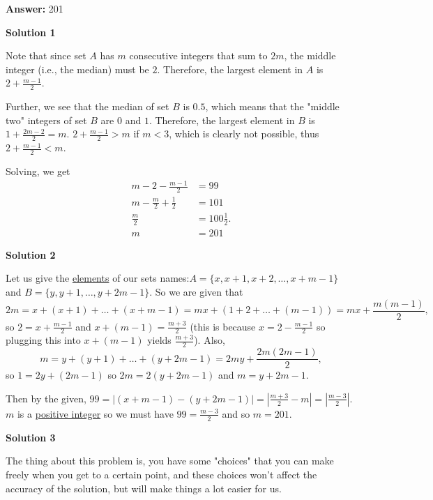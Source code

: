 \begin{enumerate}
 \textbf{Answer: }201



\textbf{Solution 1}

Note that since set $A$ has $m$ consecutive integers that sum to $2m$, the middle integer (i.e., the median) must be $2$.  Therefore, the largest element in $A$ is $2 + \frac{m-1}{2}$. 

 Further, we see that the median of set $B$ is $0.5$, which means that the "middle two" integers of set $B$ are $0$ and $1$.  Therefore, the largest element in $B$ is $1 + \frac{2m-2}{2} = m$.  $2 + \frac{m-1}{2} > m$ if $m < 3$, which is clearly not possible, thus $2 + \frac{m-1}{2} < m$.

 Solving, we get 
 \begin{align*} m - 2 - \frac{m-1}{2} &= 99\\ m-\frac{m}{2}+\frac{1}{2}&=101\\ \frac{m}{2}&=100\frac{1}{2}.\\ m &= \boxed{201}\end{align*}





\textbf{Solution 2}

Let us give the \href{https://artofproblemsolving.com/wiki/index.php?title=Element}{elements} of our sets names:$A = \{x, x + 1, x + 2, \ldots, x + m - 1\}$ and $B = \{y, y + 1, \ldots, y + 2m - 1\}$.  So we are given that
 \[2m = x + (x + 1) + \ldots + (x + m - 1) = mx + (1 + 2 + \ldots + (m - 1)) = mx + \frac{m(m -1)}2,\] so $2 = x + \frac{m - 1}2$ and $x + (m - 1) = \frac{m + 3}2$ (this is because $x = 2 - \frac{m-1}{2}$ so plugging this into $x+(m-1)$ yields $\frac{m+3}{2}$). Also,
 \[m = y + (y + 1) + \ldots + (y + 2m - 1) = 2my + \frac{2m(2m - 1)}2,\]so $1 = 2y + (2m - 1)$ so $2m = 2(y + 2m - 1)$ and $m = y + 2m - 1$.

 Then by the given, $99 = |(x + m - 1) - (y + 2m - 1)| = \left|\frac{m + 3}2 - m\right| = \left|\frac{m - 3}2\right|$.  $m$ is a \href{https://artofproblemsolving.com/wiki/index.php?title=Positive\_integer}{positive integer} so we must have $99 = \frac{m - 3}2$ and so $m = \boxed{201}$.

 



\textbf{Solution 3}

The thing about this problem is, you have some "choices" that you can make freely when you get to a certain point, and these choices won't affect the accuracy of the solution, but will make things a lot easier for us.


\end{enumerate}
